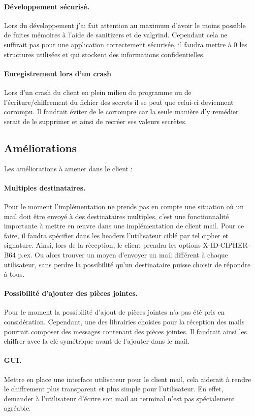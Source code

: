 \paragraph*{Développement sécurisé.}
Lors du développement j'ai fait attention au maximum d'avoir le moins possible de fuites mémoires à l'aide de sanitizers et de valgrind. Cependant cela ne suffirait pas pour une application correctement sécurisée, il faudra mettre à 0 les structures utilisées et qui stockent des informations confidentielles.
\paragraph*{Enregistrement lors d'un crash}
Lors d'un crash du client en plein milieu du programme ou de l'écriture/chiffrement du fichier des secrets il se peut que celui-ci deviennent corrompu. Il faudrait éviter de le corrompre car la seule manière d'y remédier serait de le supprimer et ainsi de recréer ses valeurs secrètes.
\subsection{Améliorations}
Les améliorations à amener dans le client :
\paragraph*{Multiples destinataires.}
Pour le moment l'implémentation ne prends pas en compte une situation où un mail doit être envoyé à des destinataires multiples, c'est une fonctionnalité importante à mettre en œuvre dans une implémentation de client mail. Pour ce faire, il faudra spécifier dans les headers l'utilisateur ciblé par tel cipher et signature. Ainsi, lors de la réception, le client prendra les options X-ID-CIPHER-B64 p.ex. Ou alors trouver un moyen d'envoyer un mail différent à chaque utilisateur, sans perdre la possibilité qu'un destinataire puisse choisir de répondre à tous.
\paragraph*{Possibilité d'ajouter des pièces jointes.}
Pour le moment la possibilité d'ajout de pièces jointes n'a pas été pris en considération. Cependant, une des librairies choisies pour la réception des mails pourrait composer des messages contenant des pièces jointes. Il faudrait ainsi les chiffrer avec la clé symétrique avant de l'ajouter dans le mail.
\paragraph*{GUI.}
Mettre en place une interface utilisateur pour le client mail, cela aiderait à rendre le chiffrement plus transparent et plus simple pour l'utilisateur. En effet, demander à l'utilisateur d'écrire son mail au terminal n'est pas spécialement agréable.
